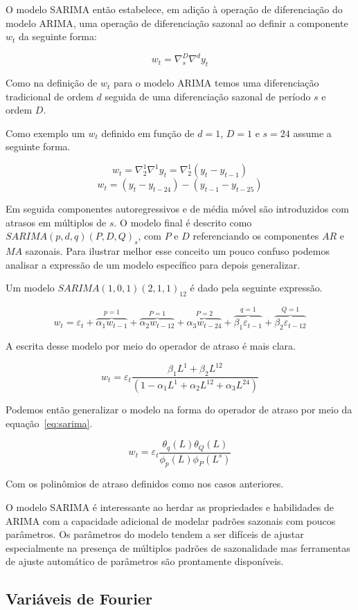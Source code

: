 O modelo SARIMA então estabelece, em adição à operação de diferenciação do
modelo ARIMA, uma operação de diferenciação sazonal ao definir a componente
$w_t$ da seguinte forma:

$$ w_t = \nabla^D_{s}\nabla^d  y_t $$

Como na definição de $w_t$ para o modelo ARIMA temos uma diferenciação
tradicional de ordem $d$ seguida de uma diferenciação sazonal de período $s$
e ordem $D$.

Como exemplo um $w_t$ definido em função de $d=1$, $D=1$ e $s=24$ assume a
seguinte forma.

$$ w_t =  \nabla^1_{2} \nabla^1 y_t = \nabla^1_{2} (y_t - y_{t-1}) $$
$$ w_t =  (y_t - y_{t-24}) - (y_{t-1} - y_{t-25}) $$

Em seguida componentes autoregressivos e de média móvel são introduzidos com
atrasos em múltiplos de $s$. O modelo final é descrito como $SARIMA(p, d, q)
(P, D, Q)_{s}$, com $P$ e $D$ referenciando os componentes $AR$ e $MA$
sazonais. Para ilustrar melhor esse conceito um pouco confuso podemos analisar a
expressão de um modelo específico para depois generalizar.

Um modelo $SARIMA(1, 0, 1)(2, 1, 1)_{12}$ é dado pela seguinte expressão.

$$ w_t = \varepsilon_t + \overbrace{\alpha_1 w_{t-1}}^{p = 1} + \overbrace{
\alpha_2 w_{t-12}}^{P=1} + \overbrace{\alpha_3 w_{t-24}}^{P=2} +
\overbrace{\beta_1 \varepsilon_{t-1}}^{q=1} + \overbrace{\beta_2
\varepsilon_{t-12}}^{Q=1}$$

A escrita desse modelo por meio do operador de atraso é mais clara.

$$  w_t = \varepsilon_t \frac{\beta_1 L^1 + \beta_2 L^{12}}{(1 - \alpha_1 L^1 + \alpha_2 L^{12} + \alpha_3 L^{24})}  $$

Podemos então generalizar o modelo na forma do operador de atraso por meio da
equação~\ref{eq:sarima}.

\begin{equation}\label{eq:sarima}
    w_t = \varepsilon_{t} \frac{\theta_q(L)\theta_Q(L)}{\phi_p (L) \phi_P (L^s)}
\end{equation}

Com os polinômios de atraso definidos como nos casos anteriores.

O modelo SARIMA é interessante ao herdar as propriedades e habilidades de
ARIMA com a capacidade adicional de modelar padrões sazonais com poucos
parâmetros. Os parâmetros do modelo tendem a ser difíceis de ajustar
especialmente na presença de múltiplos padrões de sazonalidade mas ferramentas
de ajuste automático de parâmetros são prontamente disponíveis.

\subsection{Variáveis de Fourier}
